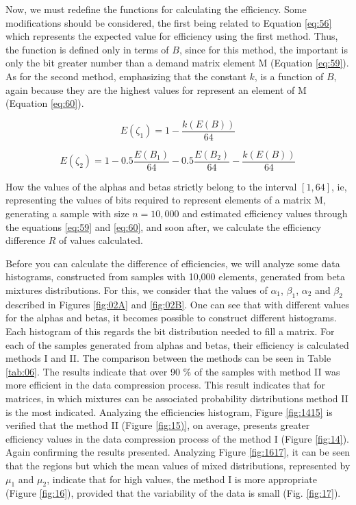 \documentclass[10pt]{article}
\begin{document}
Now, we must redefine the functions for calculating the efficiency. Some modifications should be considered, the first being related to Equation \ref{eq:56} which represents the expected value for efficiency using the first method. Thus, the function is defined only in terms of $B$, since for this method, the important is only the bit greater number than a demand matrix element M (Equation \ref{eq:59}). As for the second method​​, emphasizing that the constant $k$, is a function of $B$, again because they are the highest values ​​for represent an element of M (Equation \ref{eq:60}).

\begin{equation}\label{eq:59}
 E(\zeta_1) = 1 - \frac{k(E(B))}{64}
\end{equation}

\begin{equation}\label{eq:60}
 E(\zeta_2) = 1 - 0.5\frac{E(B_1)}{64} - 0.5\frac{E(B_2)}{64} - \frac{k(E(B))}{64}
\end{equation}
 
How the values ​​of the alphas and betas strictly belong to the interval $[1,64]$, ie, representing the values ​​of bits required to represent elements of a matrix M, generating a sample with size $n=10,000$ and estimated efficiency values through the equations \ref{eq:59} and \ref{eq:60}, and soon after, we calculate the efficiency difference $R$ of values ​​calculated. 

Before you can calculate the difference of efficiencies, we will analyze some data histograms, constructed from samples with 10,000 elements, generated from beta mixtures distributions. For this, we consider that the values ​​of $\alpha_1$, $\beta_1$, $\alpha_2$ and $\beta_2$ described in Figures \ref{fig:02A} and \ref{fig:02B}. One can see that with different values ​​for the alphas and betas, it becomes possible to construct different histograms. Each histogram of this regards the bit distribution needed to fill a matrix. For each of the samples generated from alphas and betas, their efficiency is calculated methods I and II. The comparison between the methods can be seen in Table \ref{tab:06}. The results indicate that over 90 \% of the samples with method II was more efficient in the data compression process. This result indicates that for matrices, in which mixtures can be associated probability distributions method II is the most indicated. Analyzing the efficiencies histogram, Figure \ref{fig:1415} is 
verified that the method II (Figure \ref{fig:15)}, on average, presents greater efficiency values ​​in the data compression process of the method I (Figure \ref{fig:14}). Again confirming the results presented. Analyzing Figure \ref{fig:1617}, it can be seen that the regions but which the mean values ​​of mixed distributions, represented by $\mu_1$ and $\mu_2$, indicate that for high values​​, the method I is more appropriate (Figure \ref{fig:16}), provided that the variability of the data is small (Fig. \ref{fig:17}).
\end{document}
